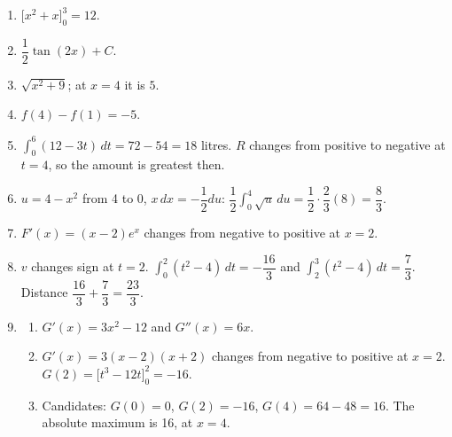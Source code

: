 \documentclass[11pt]{article}
\begin{document}
\newpage
\begin{solbox}
\begin{enumerate}[leftmargin=*,itemsep=4pt]
  \item $\Big[x^2+x\Big]_0^3=12$.
  \item $\dfrac12\tan(2x)+C$.
  \item $\sqrt{x^2+9}$; at $x=4$ it is $5$.
  \item $f(4)-f(1)=-5$.
  \item $\displaystyle\int_{0}^{6}(12-3t)\,dt=72-54=18$ litres. $R$ changes from positive to negative at $t=4$, so the amount is greatest then.
  \item $u=4-x^2$ from 4 to 0, $x\,dx=-\dfrac12du$: $\dfrac12\displaystyle\int_{0}^{4}\sqrt u\,du=\dfrac12\cdot\dfrac23(8)=\dfrac83$.
  \item $F'(x)=(x-2)e^{x}$ changes from negative to positive at $x=2$.
  \item $v$ changes sign at $t=2$. $\displaystyle\int_{0}^{2}(t^2-4)\,dt=-\dfrac{16}{3}$ and $\displaystyle\int_{2}^{3}(t^2-4)\,dt=\dfrac73$. Distance $\dfrac{16}{3}+\dfrac73=\dfrac{23}{3}$.
  \item \begin{enumerate}[label=(\alph*),leftmargin=*,itemsep=3pt]
    \item $G'(x)=3x^2-12$ and $G''(x)=6x$.
    \item $G'(x)=3(x-2)(x+2)$ changes from negative to positive at $x=2$. $G(2)=\Big[t^3-12t\Big]_0^2=-16$.
    \item Candidates: $G(0)=0$, $G(2)=-16$, $G(4)=64-48=16$. The absolute maximum is 16, at $x=4$.
  \end{enumerate}
\end{enumerate}
\end{solbox}
\end{document}
